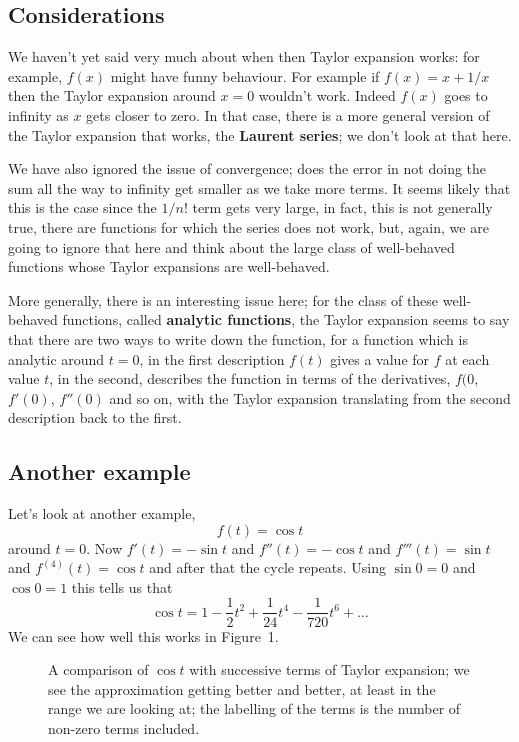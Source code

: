 \documentclass[12pt]{article}
\begin{document}
\subsection*{Considerations}
We haven't yet said very much about when then Taylor expansion works: for example, $f(x)$ might have funny
behaviour. For example if $f(x)=x+1/x$ then the Taylor expansion
around $x=0$ wouldn't work. Indeed $f(x)$ goes to infinity as $x$
gets closer to zero. In that case, there is a more general version of
the Taylor expansion that works, the \textbf{Laurent series}; we don't
look at that here. 

We have also ignored the issue of convergence; does
the error in not doing the sum all the way to infinity get smaller as
we take more terms. It seems likely that this is the case since the
$1/n!$ term gets very large, in fact, this is not generally true,
there are functions for which the series does not work, but, again, we
are going to ignore that here and think about the large class of
well-behaved functions whose Taylor expansions are well-behaved.

More generally, there is an interesting issue here; for the class of these
well-behaved functions, called \textbf{analytic functions}, the Taylor
expansion seems to say that there are two ways to write down the
function, for a function which is analytic around $t=0$, in the first
description $f(t)$ gives a value for $f$ at each value $t$, in the
second, describes the function in terms of the derivatives, $f(0$,
$f'(0)$, $f''(0)$ and so on, with the Taylor expansion translating
from the second description back to the first. 

\subsection*{Another example}
Let's look at another example,
\begin{equation}
  f(t)=\cos{t}
\end{equation}
around $t=0$. Now $f'(t)=-\sin{t}$ and $f''(t)=-\cos{t}$ and
$f'''(t)=\sin{t}$ and $f^{(4)}(t)=\cos{t}$ and after that the cycle
repeats. Using $\sin{0}=0$ and $\cos{0}=1$ this tells us that
\begin{equation}
  \cos{t}=1-\frac{1}{2}t^2+\frac{1}{24}t^4-\frac{1}{720}t^6+\ldots
\end{equation}
We can see how well this works in Figure~1.
\begin{figure}[h!]
  \begin{center}
    
    \end{center}
  \caption{A comparison of $\cos{t}$ with successive terms of Taylor expansion; we see the approximation getting better and better, at least in the range we are looking at; the labelling of the terms is the number of non-zero terms included.}
\end{figure}
\end{document}
